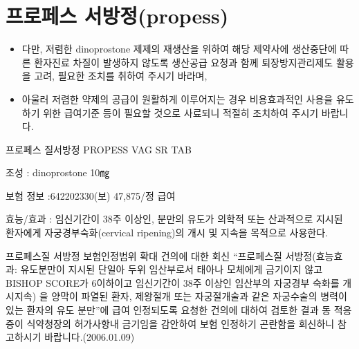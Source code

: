 \section{프로페스 서방정(propess)}
\begin{itemize}\tightlist  
\item 다만, 저렴한 dinoprostone 제제의 재생산을 위하여 해당 제약사에 생산중단에 따른 환자진료 차질이 발생하지 않도록 생산공급 요청과 함께 퇴장방지관리제도 활용을 고려, 필요한 조치를 취하여 주시기 바라며, 
\item 아울러 저렴한 약제의 공급이 원활하게 이루어지는 경우 비용효과적인 사용을 유도하기 위한 급여기준 등이 필요할 것으로 사료되니 적절히 조치하여 주시기 바랍니다. 
\end{itemize}
프로페스 질서방정 PROPESS VAG SR TAB \par
조성 : dinoprostone 10㎎ \par
보험 정보 :642202330(보) 47,875/정 급여\par
효능/효과 : 임신기간이 38주 이상인, 분만의 유도가 의학적 또는 산과적으로 지시된 환자에게 자궁경부숙화(cervical ripening)의 개시 및 지속을 목적으로 사용한다.

\begin{hemphsentense}{프로페스질 서방정 보험인정범위 확대 건의에 대한 회신}
``프로페스질 서방정(효능\cntrdot{}효과: 유도분만이 지시된 단일아 두위 임산부로서 태아나 모체에게 금기이지 않고 BISHOP SCORE가 6이하이고 임신기간이 38주 이상인 임산부의 자궁경부 숙화를 개시\cntrdot{}지속) 을 양막이 파열된 환자, 제왕절개 또는 자궁절개술과 같은 자궁수술의 병력이 있는 환자의 유도 분만''에 급여 인정되도록 요청한 건의에 대하여 검토한 결과 동 적응증이 식약청장의 허가사항내 금기임을 감안하여 보험 인정하기 곤란함을 회신하니 참고하시기 바랍니다.(2006.01.09) 
\end{hemphsentense}

